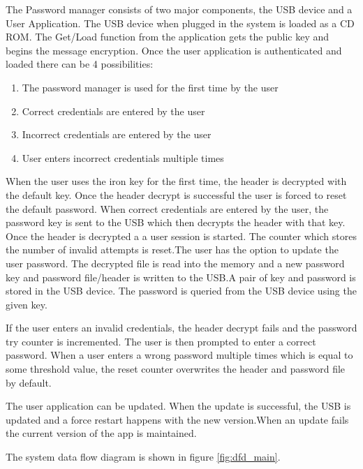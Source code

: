 The Password manager consists of two major components, the USB device and a User
Application. The USB device when plugged in the system is loaded as a CD
ROM. The Get/Load function from the application gets the public key and begins
the message
encryption. Once the user application is authenticated and loaded there can be 4
possibilities:
\begin{enumerate}
\item The password manager is used for the first time by the user
\item Correct credentials are entered by the user
\item Incorrect credentials are entered by the user
\item User enters incorrect credentials multiple times
\end{enumerate}

When the user uses the iron key for the first time, the header is decrypted with
the default key. Once the header decrypt is successful the user is forced to
reset the default password. When correct credentials are entered by the user,
the password key is sent to the USB which then decrypts the header with that
key.  Once the header is decrypted a a user session is started. The counter
which stores the number of invalid attempts is reset.The user has the option to
update the user password. The decrypted file is read into the memory and a new
password key and password file/header is written to the USB.A pair of key and
password is stored in the USB device. The password is queried from the USB
device using the given key.

If the user enters an invalid credentials, the header decrypt fails and the
password try counter is incremented. The user is
then prompted to enter a correct password. When a user enters a wrong password
multiple times which is equal to some threshold value, the reset counter
overwrites the header and password file by default.

The user application can be updated. When the update is successful, the USB is
updated and a force restart happens with the new version.When an update fails
the current version of the app is maintained.

The system data flow diagram is shown in figure \ref{fig:dfd_main}.


